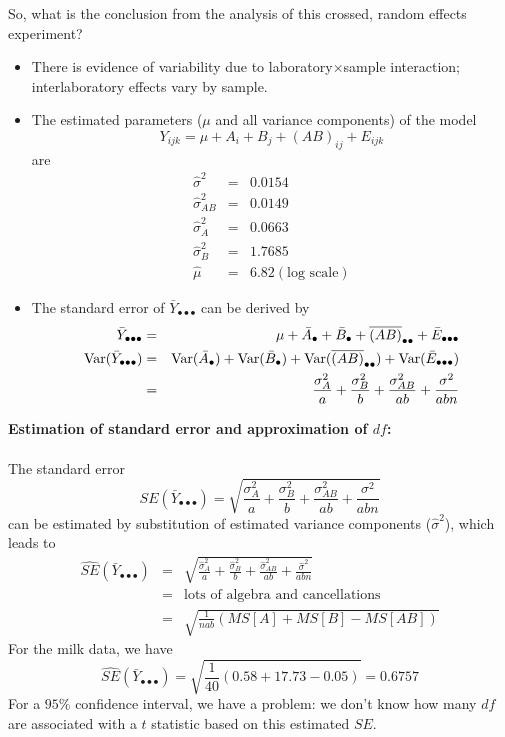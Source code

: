 \newpage

So, what is the conclusion from the analysis of this crossed, random effects experiment?

\begin{itemize}
\item There is evidence of variability due to laboratory$\times$sample interaction; interlaboratory effects vary by sample.
\item The estimated parameters ($\mu$ and all variance components) of the model
$$ Y_{ijk} = \mu + A_i + B_j + (AB)_{ij} + E_{ijk} $$
are
\begin{eqnarray*}
\hat\sigma^2 &=& 0.0154 \\
\hat\sigma_{AB}^2 &=&  0.0149 \\
\hat\sigma_{A}^2 &=&  0.0663 \\ 
\hat\sigma_{B}^2 &=&  1.7685  \\
\hat\mu &=&  6.82 (\mbox{log scale})
\end{eqnarray*}
\item The standard error of $\bar{Y}_{\bullet\bullet\bullet}$ can be derived by
\begin{eqnarray*}
\bar{Y}_{\bullet\bullet\bullet} &=& \mu + \bar{A}_{\bullet} + \bar{B}_{\bullet} + \overline{(AB)}_{\bullet\bullet} + \bar{E}_{\bullet\bullet\bullet} \\
\mbox{Var}(\bar{Y}_{\bullet\bullet\bullet}) &=& \mbox{Var}(\bar{A}_{\bullet}) + \mbox{Var}(\bar{B}_{\bullet}) + \mbox{Var}(\overline{(AB)}_{\bullet\bullet}) + \mbox{Var}(\bar{E}_{\bullet\bullet\bullet}) \\
& = & \frac{\sigma_A^2}{a} + \frac{\sigma_B^2}{b} +  \frac{\sigma_{AB}^2}{ab} + \frac{\sigma^2}{abn} 
\end{eqnarray*}
\end{itemize}
\textbf{Estimation of standard error and approximation of $df$:}\\~\\
The standard error 
$$SE(\bar{Y}_{\bullet\bullet\bullet}) = \sqrt{\frac{\sigma_A^2}{a} + \frac{\sigma_B^2}{b} +  \frac{\sigma_{AB}^2}{ab} + \frac{\sigma^2}{abn}}$$
can be estimated by substitution of estimated variance components ($\hat\sigma^2$), which leads to 
\begin{eqnarray*}
\widehat{SE}(\bar{Y}_{\bullet\bullet\bullet}) &=& \sqrt{\frac{\hat\sigma_A^2}{a} + \frac{\hat\sigma_B^2}{b} +  \frac{\hat\sigma_{AB}^2}{ab} + \frac{\hat\sigma^2}{abn}} \\
&=& \mbox{lots of algebra and cancellations}\\
&=& \sqrt{\frac{1}{nab}\left(MS[A]+MS[B]-MS[AB]\right)}
\end{eqnarray*}
For the milk data, we have
$$ \widehat{SE}(\bar{Y}_{\bullet\bullet\bullet}) = \sqrt{\frac{1}{40}(0.58+ 17.73-0.05)} = 0.6757$$
For a $95\%$ confidence interval, we have a problem: we don't know how many $df$ are associated with a $t$ statistic based on this estimated $SE$.  \\~\\

